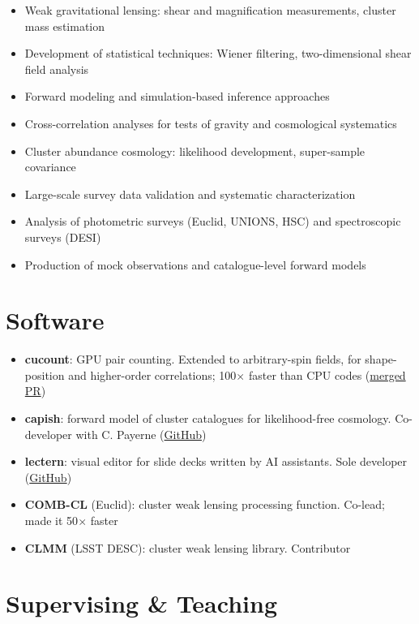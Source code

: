 \documentclass[11pt]{article}
\begin{document}
\begin{itemize}[leftmargin=1.5em, itemsep=0.2em]
\item Weak gravitational lensing: shear and magnification measurements, cluster mass estimation
\item Development of statistical techniques: Wiener filtering, two-dimensional shear field analysis
\item Forward modeling and simulation-based inference approaches
\item Cross-correlation analyses for tests of gravity and cosmological systematics
\item Cluster abundance cosmology: likelihood development, super-sample covariance
\item Large-scale survey data validation and systematic characterization
\item Analysis of photometric surveys (Euclid, UNIONS, HSC) and spectroscopic surveys (DESI)
\item Production of mock observations and catalogue-level forward models
\end{itemize}

\section*{Software}

\begin{itemize}[leftmargin=1.5em, itemsep=0.2em]
\item \textbf{cucount}: GPU pair counting. Extended to arbitrary-spin fields, for shape-position and higher-order correlations; 100$\times$ faster than CPU codes (\href{https://github.com/adematti/cucount/pull/1}{merged PR})
\item \textbf{capish}: forward model of cluster catalogues for likelihood-free cosmology. Co-developer with C. Payerne (\href{https://github.com/calumhrmurray/capish}{GitHub})
\item \textbf{lectern}: visual editor for slide decks written by AI assistants. Sole developer (\href{https://github.com/calumhrmurray/lectern}{GitHub})
\item \textbf{COMB-CL} (Euclid): cluster weak lensing processing function. Co-lead; made it 50$\times$ faster
\item \textbf{CLMM} (LSST DESC): cluster weak lensing library. Contributor
\end{itemize}

\section*{Supervising \& Teaching}
\end{document}
